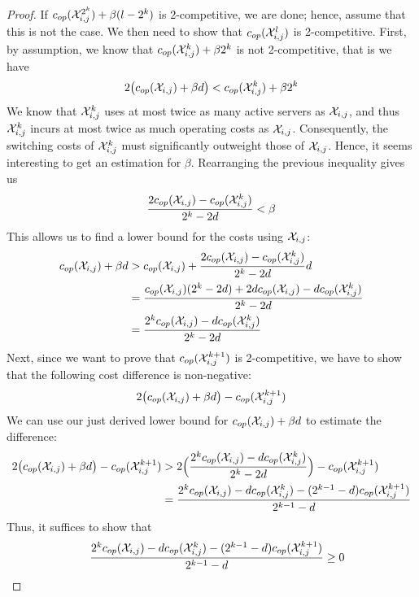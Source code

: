\begin{proof}
If $c_{op}(\mathcal{X}_{i,j}^{2^k})+\beta(l-2^k)$ is 2-competitive, we are done; hence, assume that this is not the case. We then need to show that $c_{op}(\mathcal{X}_{i,j}^l)$ is 2-competitive. First, by assumption, we know that $c_{op}(\mathcal{X}_{i,j}^k)+\beta 2^k$ is not 2-competitive, that is we have
\begin{equation*}
	2\bigl(c_{op}(\mathcal{X}_{i,j})+\beta d\bigr)<c_{op}(\mathcal{X}_{i,j}^k)+\beta 2^k
\end{equation*}
We know that $\mathcal{X}_{i,j}^k$ uses at most twice as many active servers as $\mathcal{X}_{i,j}$, and thus $\mathcal{X}_{i,j}^k$ incurs at most twice as much operating costs as $\mathcal{X}_{i,j}$. Consequently, the switching costs of $\mathcal{X}_{i,j}^k$ must significantly outweight those of $\mathcal{X}_{i,j}$. Hence, it seems interesting to get an estimation for $\beta$. Rearranging the previous inequality gives us
\begin{equation*}
	\frac{2c_{op}(\mathcal{X}_{i,j})-c_{op}(\mathcal{X}_{i,j}^k)}{2^k-2d}<\beta
\end{equation*}
This allows us to find a lower bound for the costs using $\mathcal{X}_{i,j}$:
\begin{align*}
	c_{op}(\mathcal{X}_{i,j})+\beta d&>c_{op}(\mathcal{X}_{i,j})+\frac{2c_{op}(\mathcal{X}_{i,j})-c_{op}(\mathcal{X}_{i,j}^k)}{2^k-2d}d\\
	&=\frac{c_{op}(\mathcal{X}_{i,j})(2^k-2d)+2dc_{op}(\mathcal{X}_{i,j})-dc_{op}(\mathcal{X}_{i,j}^k)}{2^k-2d}\\
	&=\frac{2^kc_{op}(\mathcal{X}_{i,j})-dc_{op}(\mathcal{X}_{i,j}^k)}{2^k-2d}
\end{align*}
Next, since we want to prove that $c_{op}(\mathcal{X}_{i,j}^{k+1})$ is 2-competitive, we have to show that the following cost difference is non-negative:
\begin{align*}
	2\bigl(c_{op}(\mathcal{X}_{i,j})+\beta d\bigr)-c_{op}(\mathcal{X}_{i,j}^{k+1})
\end{align*}
We can use our just derived lower bound for $c_{op}(\mathcal{X}_{i,j})+\beta d$ to estimate the difference:
\begin{align*}
	2\bigl(c_{op}(\mathcal{X}_{i,j})+\beta d\bigr)-c_{op}(\mathcal{X}_{i,j}^{k+1})&>2\Bigl(\frac{2^kc_{op}(\mathcal{X}_{i,j})-dc_{op}(\mathcal{X}_{i,j}^k)}{2^k-2d}\Bigr)-c_{op}(\mathcal{X}_{i,j}^{k+1})\\
	&=\frac{2^kc_{op}(\mathcal{X}_{i,j})-dc_{op}(\mathcal{X}_{i,j}^k)-(2^{k-1}-d)c_{op}(\mathcal{X}_{i,j}^{k+1})}{2^{k-1}-d}
\end{align*}
Thus, it suffices to show that
\begin{align*}
	&&\frac{2^k\opcosts(\mx_{i,j})-d\opcosts(\mx_{i,j}^k)-(2^{k-1}-d)\opcosts(\mx_{i,j}^{k+1})}{2^{k-1}-d}&\ge 0\\

\end{align*}
\end{proof}
